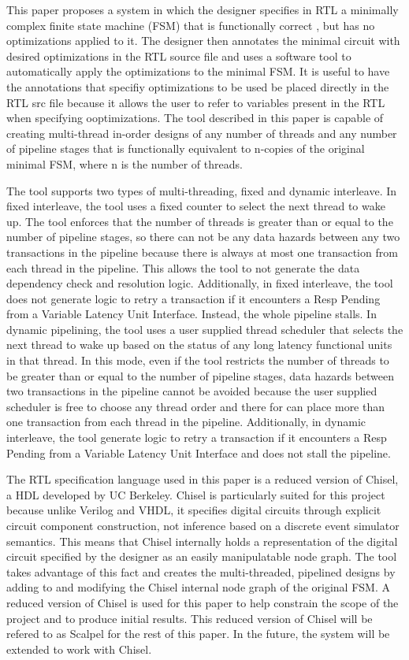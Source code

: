 This paper proposes a system in which the designer specifies in RTL a minimally complex finite state machine (FSM) that is functionally correct , but has no optimizations applied to it. The designer then annotates the minimal circuit with desired optimizations in the RTL source file and uses a software tool to automatically apply the optimizations to the minimal FSM. It is useful to have the annotations that specifiy optimizations to be used be placed directly in the RTL src file because it allows the user to refer to variables present in the RTL when specifying ooptimizations. The tool described in this paper is capable of creating multi-thread in-order designs of any number of threads and any number of pipeline stages that is functionally equivalent to n-copies of the original minimal FSM, where n is the number of threads. 

The tool supports two types of multi-threading, fixed and dynamic interleave. In fixed interleave, the tool uses a fixed counter to select the next thread to wake up. The tool enforces that the number of threads is greater than or equal to the number of pipeline stages, so there can not be any data hazards between any two transactions in the pipeline because there is always at most one transaction from each thread in the pipeline. This allows the tool to not generate the data dependency check and resolution logic. Additionally, in fixed interleave, the tool does not generate logic to retry a transaction if it encounters a Resp Pending from a Variable Latency Unit Interface. Instead, the whole pipeline stalls. In dynamic pipelining, the tool uses a user supplied thread scheduler that selects the next thread to wake up based on the status of any long latency functional units in that thread. In this mode, even if the tool restricts the number of threads to be greater than or equal to the number of pipeline stages, data hazards between two transactions in the pipeline cannot be avoided because the user supplied scheduler is free to choose any thread order and there for can place more than one transaction from each thread in the pipeline. Additionally, in dynamic interleave, the tool generate logic to retry a transaction if it encounters a Resp Pending from a Variable Latency Unit Interface and does not stall the pipeline.

The RTL specification language used in this paper is a reduced version of Chisel\cite{Bachrach:2012}, a HDL developed by UC Berkeley. Chisel is particularly suited for this project because unlike Verilog and VHDL, it specifies digital circuits through explicit circuit component construction, not inference based on a discrete event simulator semantics. This means that Chisel internally holds a representation of the digital circuit specified by the designer as an easily manipulatable node graph. The tool takes advantage of this fact and creates the multi-threaded, pipelined designs by adding to and modifying the Chisel internal node graph of the original FSM. A reduced version of Chisel is used for this paper to help constrain the scope of the project and to produce initial results. This reduced version of Chisel will be refered to as Scalpel for the rest of this paper. In the future, the system will be extended to work with Chisel.

